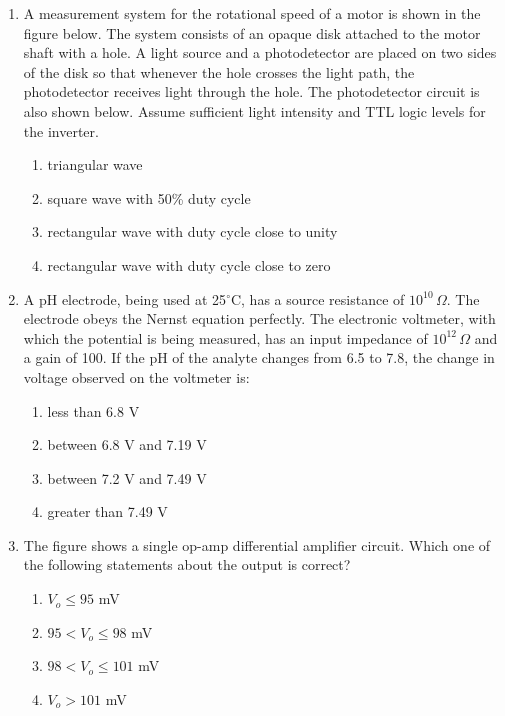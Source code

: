 \documentclass[journal]{IEEEtran}
\begin{document}
\begin{enumerate}
\item A measurement system for the rotational speed of a motor is shown in the figure below. The system consists of an opaque disk attached to the motor shaft with a hole. A light source and a photodetector are placed on two sides of the disk so that whenever the hole crosses the light path, the photodetector receives light through the hole. The photodetector circuit is also shown below. Assume sufficient light intensity and TTL logic levels for the inverter.

\begin{multicols}{2}
\begin{enumerate}
    \item triangular wave
    \item square wave with 50\% duty cycle
    \item rectangular wave with duty cycle close to unity
    \item rectangular wave with duty cycle close to zero
\end{enumerate}
\end{multicols}

\item A pH electrode, being used at 25$^\circ$C, has a source resistance of $10^{10}\,\Omega$. The electrode obeys the Nernst equation perfectly. The electronic voltmeter, with which the potential is being measured, has an input impedance of $10^{12}\,\Omega$ and a gain of 100. If the pH of the analyte changes from 6.5 to 7.8, the change in voltage observed on the voltmeter is:

\begin{multicols}{2}
\begin{enumerate}
    \item less than 6.8 V
    \item between 6.8 V and 7.19 V
    \item between 7.2 V and 7.49 V
    \item greater than 7.49 V
\end{enumerate}
\end{multicols}



\item The figure shows a single op-amp differential amplifier circuit. Which one of the following statements about the output is correct?

\begin{multicols}{2}
\begin{enumerate}
    \item $V_o \leq 95$ mV
    \item $95 < V_o \leq 98$ mV
    \item $98 < V_o \leq 101$ mV
    \item $V_o > 101$ mV
\end{enumerate}
\end{multicols}


\end{enumerate}
\end{document}
